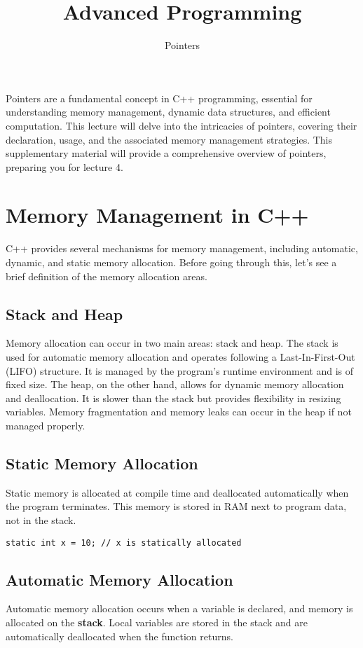 \documentclass{article}
\title{Advanced Programming}
\author{Pointers}
\date{}
\begin{document}
\maketitle

Pointers are a fundamental concept in C++ programming, essential for understanding memory management, dynamic data structures, and efficient computation. This lecture will delve into the intricacies of pointers, covering their declaration, usage, and the associated memory management strategies. This supplementary material will provide a comprehensive overview of pointers, preparing you for lecture 4.


\section{Memory Management in C++}
C++ provides several mechanisms for memory management, including automatic, dynamic, and static memory allocation. Before going through this, let's see a brief definition of the memory allocation areas.

\subsection{Stack and Heap}
Memory allocation can occur in two main areas: stack and heap. The stack is used for automatic memory allocation and operates following a Last-In-First-Out (LIFO) structure. It is managed by the program's runtime environment and is of fixed size. The heap, on the other hand, allows for dynamic memory allocation and deallocation. It is slower than the stack but provides flexibility in resizing variables. Memory fragmentation and memory leaks can occur in the heap if not managed properly.

\subsection{Static Memory Allocation}
Static memory is allocated at compile time and deallocated automatically when the program terminates. This memory is stored in RAM next to program data, not in the stack.

\begin{verbatim}
static int x = 10; // x is statically allocated
\end{verbatim}

\subsection{Automatic Memory Allocation}
Automatic memory allocation occurs when a variable is declared, and memory is allocated on the \textbf{stack}. Local variables are stored in the stack and are automatically deallocated when the function returns.
\end{document}
